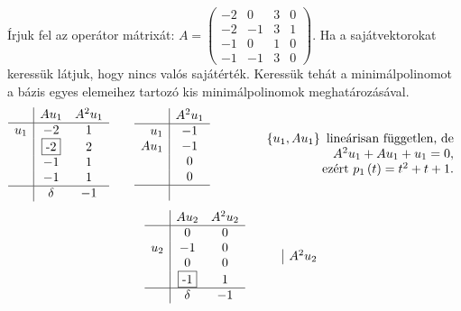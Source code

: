 \documentclass[a4paper, showtrims]{memoir}
\makeatletter
\renewenvironment{proof}[1][\proofname]
    {\par\pushQED{\qed}%
    \normalfont \topsep6\p@\@plus6\p@\relax
    \trivlist
    \item[\hskip\labelsep
        \itshape
    #1\@addpunct{:}]\ignorespaces}
    {\popQED\endtrivlist\@endpefalse}
\theoremstyle{plain}
\theoremstyle{remark}
\theoremstyle{definition}
\makeatother
\begin{document}
\begin{proof}[Megoldás]
	Írjuk fel az operátor mátrixát:
	\(
	A=
	\begin{pmatrix}
		-2 & 0  & 3 & 0 \\
		-2 & -1 & 3 & 1 \\
		-1 & 0  & 1 & 0 \\
		-1 & -1 & 3 & 0
	\end{pmatrix}.
	\)
	Ha a sajátvektorokat keressük látjuk, hogy nincs valós sajátérték.
	Keressük tehát a minimálpolinomot a bázis egyes elemeihez tartozó kis minimálpolinomok
	meghatározásával.
	\[
		\begin{array}{r|cc}
			    & Au_1          & A^2u_1 \\
			\hline
			u_1 & -2            & 1      \\
			    & \framebox{-2} & 2      \\
			    & -1            & 1      \\
			    & -1            & 1      \\
			\hline
			    & \delta        & -1
		\end{array}
		\qquad
		\begin{array}{r|c}
			     & A^2u_1 \\
			\hline
			u_1  & -1     \\
			Au_1 & -1     \\
			     & 0      \\
			     & 0      \\
			\hline
			     &
		\end{array}
		\qquad\qquad
		\begin{array}{r}
			\left\{ u_1,Au_1 \right\}\mbox{ lineárisan független, de} \\
			A^2u_1+Au_1+u_1=0,                                        \\
			\mbox{ezért } p_1\left( t \right)=t^2+t+1.
		\end{array}
	\]
	\[
		\begin{array}{r|cc}
			    & Au_2          & A^2u_2 \\
			\hline
			    & 0             & 0      \\
			u_2 & -1            & 0      \\
			    & 0             & 0      \\
			    & \framebox{-1} & 1      \\
			\hline
			    & \delta        & -1
		\end{array}
		\qquad
		\begin{array}{r|c}
			     & A^2u_2 \\

\end{array}\]
\end{proof}
\end{document}
